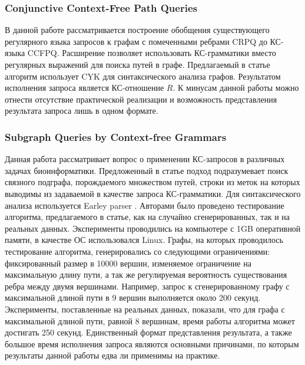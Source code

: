\documentclass[14pt]{matmex-diploma-custom}
\begin{document}
		\subsubsection*{Conjunctive Context-Free Path Queries}
		В данной работе рассматривается построение обобщения существующего регулярного языка запросов к графам с помеченными ребрами CRPQ до КС-языка CCFPQ. Расширение позволяет использовать КС-грамматики вместо регулярных выражений для поиска путей в графе. Предлагаемый в статье алгоритм использует CYK для синтаксического анализа графов. Результатом исполнения запроса является КС-отношение \(R\). К минусам данной работы можно отнести отсутствие практической реализации и возможность представления результата запроса лишь в одном формате.
		\subsubsection*{Subgraph Queries by Context-free Grammars}
		Данная работа рассматривает вопрос о применении КС-запросов в различных задачах биоинформатики. Предложенный в статье подход подразумевает поиск связного подграфа, порождаемого множеством путей, строки из меток на которых выводимы из задаваемой в качестве запроса КС-грамматики. Для синтаксического анализа используется Earley parser \cite{hale2001probabilistic}. Авторами было проведено тестирование алгоритма, предлагаемого в статье, как на случайно сгенерированных, так и на реальных данных. Эксперименты проводились на компьютере с 1GB оперативной памяти, в качестве ОС использовался Linux. Графы, на которых проводилось тестирование алгоритма, генерировались со следующими ограничениями: фиксированный размер в 10000 вершин, изменяемое ограничение на максимальную длину пути, а так же регулируемая вероятность существования ребра между двумя вершинами. Например, запрос к сгенерированному графу с максимальной длиной пути в 9 вершин выполняется около 200 секунд. Эксперименты, поставленные на реальных данных, показали, что для графа с максимальной длиной пути, равной 8 вершинам, время работы алгоритма может достигать 250 секунд. Единственный формат представления результата, а также большое время исполнения запроса являются основными причинами, по которым результаты данной работы едва ли применимы на практике.
\end{document}
